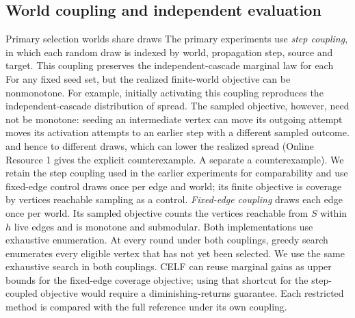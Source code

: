 \documentclass[smallextended]{svjour3}
\providecommand{\DIFaddtex}[1]{{\protect\color{blue} \sf #1}} %
\providecommand{\DIFdeltex}[1]{{\protect\color{red} \scriptsize #1}} %
\providecommand{\DIFaddbegin}{} %
\providecommand{\DIFaddend}{} %
\providecommand{\DIFdelbegin}{} %
\providecommand{\DIFdelend}{} %
\providecommand{\DIFadd}[1]{\texorpdfstring{\DIFaddtex{#1}}{#1}} %
\providecommand{\DIFdel}[1]{\texorpdfstring{\DIFdeltex{#1}}{}} %
\providecommand{\DIFscaledelfig}{0.5}
\newlength{\DIFdelgraphicswidth} %
\newlength{\DIFdelgraphicsheight} %
\providecommand{\DIFaddincludegraphics}[2][]{{\color{blue}\fbox{\DIFOincludegraphics[#1]{#2}}}} %
\providecommand{\DIFdelincludegraphics}[2][]{%
\sbox{\DIFdelgraphicsbox}{\DIFOincludegraphics[#1]{#2}}%
\settoboxwidth{\DIFdelgraphicswidth}{\DIFdelgraphicsbox} %
\settoboxtotalheight{\DIFdelgraphicsheight}{\DIFdelgraphicsbox} %
\scalebox{\DIFscaledelfig}{%
\parbox[b]{\DIFdelgraphicswidth}{\usebox{\DIFdelgraphicsbox}\\[-\baselineskip] \rule{\DIFdelgraphicswidth}{0em}}\llap{\resizebox{\DIFdelgraphicswidth}{\DIFdelgraphicsheight}{%
\setlength{\unitlength}{\DIFdelgraphicswidth}%
\begin{picture}(1,1)%
\thicklines\linethickness{2pt} %
{\color[rgb]{1,0,0}\put(0,0){\framebox(1,1){}}}%
{\color[rgb]{1,0,0}\put(0,0){\line( 1,1){1}}}%
{\color[rgb]{1,0,0}\put(0,1){\line(1,-1){1}}}%
\end{picture}%
}\hspace*{3pt}}} %
} %
\DeclareRobustCommand{\DIFaddbegin}{\DIFOaddbegin \let\includegraphics\DIFaddincludegraphics} %
\DeclareRobustCommand{\DIFaddend}{\DIFOaddend \let\includegraphics\DIFOincludegraphics} %
\DeclareRobustCommand{\DIFdelbegin}{\DIFOdelbegin \let\includegraphics\DIFdelincludegraphics} %
\DeclareRobustCommand{\DIFdelend}{\DIFOaddend \let\includegraphics\DIFOincludegraphics} %
\begin{document}
\subsection{World coupling and independent evaluation}\label{sec:coupling}
\DIFdelbegin \DIFdel{Primary selection worlds share draws }\DIFdelend \DIFaddbegin \DIFadd{The primary experiments use \emph{step coupling}, in which each random draw is }\DIFaddend indexed by world, propagation step, source and target. \DIFdelbegin \DIFdel{This coupling preserves the independent-cascade marginal law for each }\DIFdelend \DIFaddbegin \DIFadd{For any }\DIFaddend fixed seed set, \DIFdelbegin \DIFdel{but the realized finite-world objective can be nonmonotone. For example, initially activating }\DIFdelend \DIFaddbegin \DIFadd{this coupling reproduces the independent-cascade distribution of spread. The sampled objective, however, need not be monotone: seeding }\DIFaddend an intermediate vertex \DIFdelbegin \DIFdel{can move its outgoing attempt }\DIFdelend \DIFaddbegin \DIFadd{moves its activation attempts }\DIFaddend to an earlier step \DIFdelbegin \DIFdel{with a different sampled outcome. }\DIFdelend \DIFaddbegin \DIFadd{and hence to different draws, which can lower the realized spread (}\DIFaddend Online Resource 1 gives \DIFdelbegin \DIFdel{the explicit counterexample. A separate }\DIFdelend \DIFaddbegin \DIFadd{a counterexample). We retain the step coupling used in the earlier experiments for comparability and use }\DIFaddend fixed-edge \DIFdelbegin \DIFdel{control draws once per edge and world; its finite objective is coverage by vertices reachable }\DIFdelend \DIFaddbegin \DIFadd{sampling as a control. \emph{Fixed-edge coupling} draws each edge once per world. Its sampled objective counts the vertices reachable from $S$ }\DIFaddend within $h$ \DIFaddbegin \DIFadd{live }\DIFaddend edges and is monotone and submodular. \DIFdelbegin \DIFdel{Both implementations use exhaustive enumeration. }\DIFdelend \DIFaddbegin \DIFadd{At every round under both couplings, greedy search enumerates every eligible vertex that has not yet been selected. We use the same exhaustive search in both couplings. CELF can reuse marginal gains as upper bounds for the fixed-edge coverage objective; using that shortcut for the step-coupled objective would require a diminishing-returns guarantee. Each restricted method is compared with the full reference under its own coupling.
}\DIFaddend 
\end{document}
